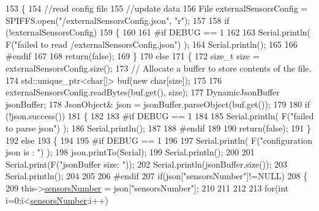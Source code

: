 \begin{DoxyCode}
153 \{
154     \textcolor{comment}{//read config file}
155     \textcolor{comment}{//update data}
156     File externalSensorsConfig = SPIFFS.open(\textcolor{stringliteral}{"/externalSensorsConfig.json"}, \textcolor{stringliteral}{"r"});
157 
158     \textcolor{keywordflow}{if} (!externalSensorsConfig) 
159     \{
160     
161 \textcolor{preprocessor}{    #if DEBUG == 1}
162         
163         Serial.println( F(\textcolor{stringliteral}{"failed to read /externalSensorsConfig.json"}) );
164         Serial.println();
165     
166 \textcolor{preprocessor}{    #endif}
167         
168         \textcolor{keywordflow}{return}(\textcolor{keyword}{false});
169     \}
170     \textcolor{keywordflow}{else}
171     \{
172         \textcolor{keywordtype}{size\_t} size = externalSensorsConfig.size();
173         \textcolor{comment}{// Allocate a buffer to store contents of the file.}
174         std::unique\_ptr<char[]> buf(\textcolor{keyword}{new} \textcolor{keywordtype}{char}[size]);
175 
176         externalSensorsConfig.readBytes(buf.get(), size);
177         DynamicJsonBuffer jsonBuffer;
178         JsonObject& json = jsonBuffer.parseObject(buf.get());
179 
180         \textcolor{keywordflow}{if} (!json.success()) 
181         \{
182         
183 \textcolor{preprocessor}{        #if DEBUG == 1 }
184 
185             Serial.println( F(\textcolor{stringliteral}{"failed to parse json"}) );
186             Serial.println();
187         
188 \textcolor{preprocessor}{        #endif}
189 
190             \textcolor{keywordflow}{return}(\textcolor{keyword}{false});
191         \} 
192         \textcolor{keywordflow}{else}
193         \{
194         
195 \textcolor{preprocessor}{        #if DEBUG == 1 }
196     
197             Serial.println( F(\textcolor{stringliteral}{"configuration json is : "}) );
198             json.printTo(Serial);
199             Serial.println();
200 
201             Serial.print(F(\textcolor{stringliteral}{"jsonBuffer size: "}));
202             Serial.println(jsonBuffer.size());
203             Serial.println();
204 
205         
206 \textcolor{preprocessor}{        #endif          }
207             \textcolor{keywordflow}{if}(json[\textcolor{stringliteral}{"sensorsNumber"}]!=NULL)
208             \{
209                 this->\hyperlink{class_external_sensors_a58e4fbf9adeae787d92be5fa33043b5d}{sensorsNumber} = json[\textcolor{stringliteral}{"sensorsNumber"}];
210                 
211                 
212 
213                 \textcolor{keywordflow}{for}(\textcolor{keywordtype}{int} i=0;i<\hyperlink{class_external_sensors_a58e4fbf9adeae787d92be5fa33043b5d}{sensorsNumber};i++)

\end{DoxyCode}
